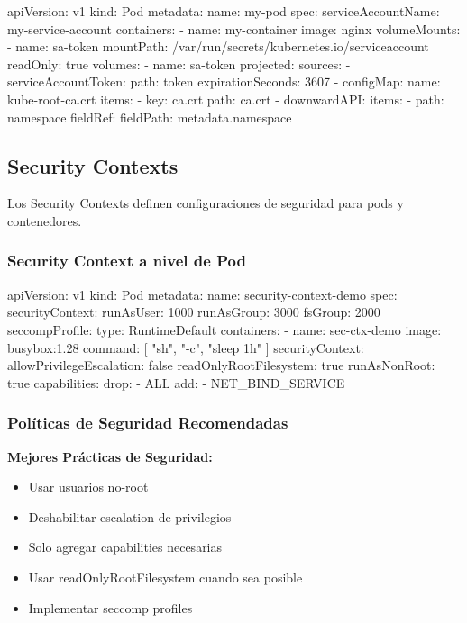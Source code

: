 \documentclass[11pt,a4paper]{article}
\begin{document}
\begin{commandbox}
apiVersion: v1
kind: Pod
metadata:
  name: my-pod
spec:
  serviceAccountName: my-service-account
  containers:
  - name: my-container
    image: nginx
    volumeMounts:
    - name: sa-token
      mountPath: /var/run/secrets/kubernetes.io/serviceaccount
      readOnly: true
  volumes:
  - name: sa-token
    projected:
      sources:
      - serviceAccountToken:
          path: token
          expirationSeconds: 3607
      - configMap:
          name: kube-root-ca.crt
          items:
          - key: ca.crt
            path: ca.crt
      - downwardAPI:
          items:
          - path: namespace
            fieldRef:
              fieldPath: metadata.namespace
\end{commandbox}

\subsection{Security Contexts}

Los Security Contexts definen configuraciones de seguridad para pods y contenedores.

\subsubsection{Security Context a nivel de Pod}

\begin{commandbox}
apiVersion: v1
kind: Pod
metadata:
  name: security-context-demo
spec:
  securityContext:
    runAsUser: 1000
    runAsGroup: 3000
    fsGroup: 2000
    seccompProfile:
      type: RuntimeDefault
  containers:
  - name: sec-ctx-demo
    image: busybox:1.28
    command: [ "sh", "-c", "sleep 1h" ]
    securityContext:
      allowPrivilegeEscalation: false
      readOnlyRootFilesystem: true
      runAsNonRoot: true
      capabilities:
        drop:
        - ALL
        add:
        - NET\_BIND\_SERVICE
\end{commandbox}

\subsubsection{Políticas de Seguridad Recomendadas}

\begin{tipbox}
\textbf{Mejores Prácticas de Seguridad:}
\begin{itemize}
    \item Usar usuarios no-root
    \item Deshabilitar escalation de privilegios
    \item Solo agregar capabilities necesarias
    \item Usar readOnlyRootFilesystem cuando sea posible
    \item Implementar seccomp profiles
\end{itemize}
\end{tipbox}
\end{document}
